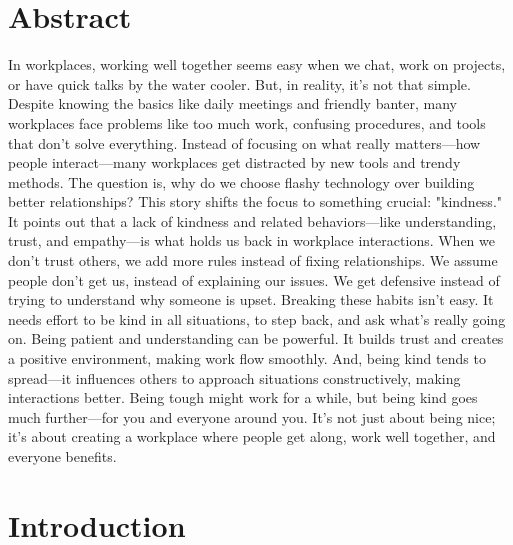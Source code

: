 \documentclass[a4paper, 11pt]{report}
\begin{document}
\begin{titlepage}
	
	\vfill %
	
\end{titlepage}

\tableofcontents

\pagebreak

\section{Abstract}

In workplaces, working well together seems easy when we chat, work on projects, or have quick talks by the water cooler. But, in reality, it's not that simple. Despite knowing the basics like daily meetings and friendly banter, many workplaces face problems like too much work, confusing procedures, and tools that don't solve everything. Instead of focusing on what really matters—how people interact—many workplaces get distracted by new tools and trendy methods. The question is, why do we choose flashy technology over building better relationships? This story shifts the focus to something crucial: "kindness." It points out that a lack of kindness and related behaviors—like understanding, trust, and empathy—is what holds us back in workplace interactions. When we don't trust others, we add more rules instead of fixing relationships. We assume people don't get us, instead of explaining our issues. We get defensive instead of trying to understand why someone is upset. Breaking these habits isn't easy. It needs effort to be kind in all situations, to step back, and ask what's really going on. Being patient and understanding can be powerful. It builds trust and creates a positive environment, making work flow smoothly. And, being kind tends to spread—it influences others to approach situations constructively, making interactions better. Being tough might work for a while, but being kind goes much further—for you and everyone around you. It's not just about being nice; it's about creating a workplace where people get along, work well together, and everyone benefits.

\pagebreak
\section{Introduction}
\end{document}
